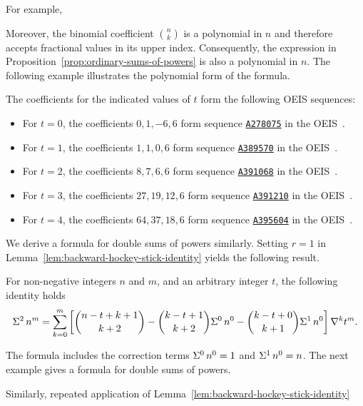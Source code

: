 For example,

Moreover, the binomial coefficient $\binom{n}{k}$ is a polynomial
in $n$ and therefore accepts fractional values in its upper index.
Consequently, the expression in Proposition~\eqref{prop:ordinary-sums-of-powers}
is also a polynomial in $n$.
The following example illustrates the polynomial form of the formula.

The coefficients for the indicated values of $t$ form the following OEIS sequences:
\begin{itemize}
  \item For $t=0$, the coefficients $0, 1, -6, 6$ form sequence \href{https://oeis.org/A278075}{\texttt{A278075}} in the OEIS~\cite{sloane2003line}.
  \item For $t=1$, the coefficients $1, 1, 0, 6$ form sequence \href{https://oeis.org/A389570}{\texttt{A389570}} in the OEIS~\cite{sloane2003line}.
  \item For $t=2$, the coefficients $8, 7, 6, 6$ form sequence \href{https://oeis.org/A391068}{\texttt{A391068}} in the OEIS~\cite{sloane2003line}.
  \item For $t=3$, the coefficients $27, 19, 12, 6$ form sequence \href{https://oeis.org/A391210}{\texttt{A391210}} in the OEIS~\cite{sloane2003line}.
  \item For $t=4$, the coefficients $64, 37, 18, 6$ form sequence \href{https://oeis.org/A395604}{\texttt{A395604}} in the OEIS~\cite{sloane2003line}.
\end{itemize}
We derive a formula for double sums of powers similarly.
Setting $r=1$ in Lemma~\eqref{lem:backward-hockey-stick-identity}
yields the following result.
\begin{proposition}
  \label{prop:double-sums-of-powers}
  For non-negative integers $n$ and $m$, and an arbitrary integer $t$, the following identity holds
  \begin{align*}
    \Sigma^{2}\,{n}^{m}
    = \sum_{k=0}^{m}
    \left[
      \binom{n-t+k+1}{k+2}
      - \binom{k-t+1}{k+2} \Sigma^{0}\,{n}^{0}
      - \binom{k-t+0}{k+1} \Sigma^{1}\,{n}^{0}
    \right] \nabla^{k} t^m.
  \end{align*}
\end{proposition}
The formula includes the correction terms $\Sigma^{0}\,{n}^{0}=1$
and $\Sigma^{1}\,{n}^{0}=n$.
The next example gives a formula for double sums of powers.

Similarly, repeated application of Lemma~\eqref{lem:backward-hockey-stick-identity}
